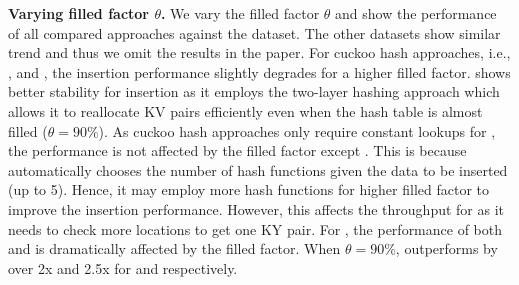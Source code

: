 \vspace{1mm}\noindent\textbf{Varying filled factor $\theta$.}
We vary the filled factor $\theta$ and show the performance of all compared approaches against the \dsrandom dataset. The other datasets show similar trend and thus we omit the results in the paper.
For cuckoo hash approaches, i.e., \cudpp, \megakv and \voter, 
the insertion performance slightly degrades for a higher filled factor. \voter shows better stability for insertion as it employs the two-layer hashing approach which allows it to reallocate KV pairs efficiently even when the hash table is almost filled ($\theta=90\%$).
As cuckoo hash approaches only require constant lookups for , the performance is not affected by the filled factor except \cudpp.
This is because \cudpp automatically chooses the number of hash functions given the data to be inserted (up to 5). 
Hence, it may employ more hash functions for higher filled factor to improve the insertion performance. 
However, this affects the throughput for  as it needs to check more locations to get one KY pair.  
For \slab, the performance of both  and  is dramatically affected by the filled factor. When $\theta=90\%$, \voter outperforms \slab by over 2x and 2.5x for  and  respectively.




